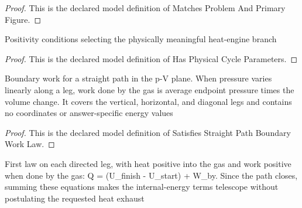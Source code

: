 \begin{proof}
  This is the declared model definition of Matches Problem And Primary Figure.
\end{proof}
\begin{definition}
  \label{def:physics:phyx-mini-0421:phyxminiproblems-problemphyxmini0421-hasphysicalcycleparameters}
  Positivity conditions selecting the physically meaningful heat-engine branch
\end{definition}
\begin{proof}
  This is the declared model definition of Has Physical Cycle Parameters.
\end{proof}
\begin{definition}
  \label{def:physics:phyx-mini-0421:phyxminiproblems-problemphyxmini0421-satisfiesstraightpathboundaryworklaw}
  Boundary work for a straight path in the p-V plane. When pressure varies linearly along a leg, work done by the gas is average endpoint pressure times the volume change. It covers the vertical, horizontal, and diagonal legs and contains no coordinates or answer-specific energy values
\end{definition}
\begin{proof}
  This is the declared model definition of Satisfies Straight Path Boundary Work Law.
\end{proof}
\begin{definition}
  \label{def:physics:phyx-mini-0421:phyxminiproblems-problemphyxmini0421-satisfiesfirstlawoneachleg}
  First law on each directed leg, with heat positive into the gas and work positive when done by the gas: Q = (U\_finish - U\_start) + W\_by. Since the path closes, summing these equations makes the internal-energy terms telescope without postulating the requested heat exhaust
\end{definition}
